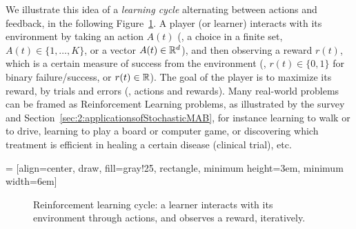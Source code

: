 We illustrate this idea of a \emph{learning cycle} alternating between actions and feedback,
in the following Figure~\ref{fig:1:ReinforcementLearningCycle}.
A player (or learner) interacts with its environment by taking an action $A(t)$ (\eg, a choice in a finite set, $A(t)\in\{1,\dots,K\}$, or a vector $A(t)\in\mathbb{R}^d$), and then observing a reward $r(t)$, which is a certain measure of success from the environment (\eg, $r(t)\in\{0,1\}$ for binary failure/success, or $r(t)\in\mathbb{R}$).
The goal of the player is to maximize its reward, by trials and errors (\ie, actions and rewards).
Many real-world problems can be framed as Reinforcement Learning problems, as illustrated by the survey \cite{bouneffouf2019survey} and Section~\ref{sec:2:applicationsofStochasticMAB}, for instance learning to walk or to drive, learning to play a board or computer game, or discovering which treatment is efficient in healing a certain disease (clinical trial), etc.


 = [align=center, draw, fill=gray!25, rectangle, minimum height=3em, minimum width=6em]
\begin{figure}[h!]
    \centering
\caption{Reinforcement learning cycle: a learner interacts with its environment through actions, and observes a reward, iteratively.}
\label{fig:1:ReinforcementLearningCycle}
\end{figure}


